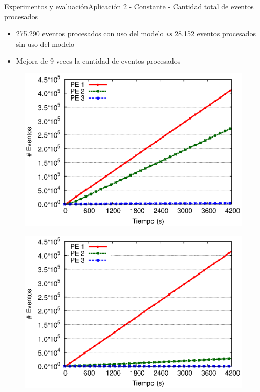 \begin{frame}{Experimentos y evaluación}{Aplicación 2 - Constante - Cantidad total de eventos procesados}

\begin{itemize}
\item 275.290 eventos procesados con uso del modelo \textit{vs} 28.152 eventos procesados sin uso del modelo
\item Mejora de 9 veces la cantidad de eventos procesados
\end{itemize}

\begin{multicols}{2}
\begin{figure}[p]
	\centering
	\includegraphics[scale=0.475]{images/exp/app2/uniform/cm/eventCount.eps}
\end{figure}

\begin{figure}[p]
	\centering
	\includegraphics[scale=0.475]{images/exp/app2/uniform/sm/eventCount.eps}
\end{figure}
\end{multicols}
\end{frame}

